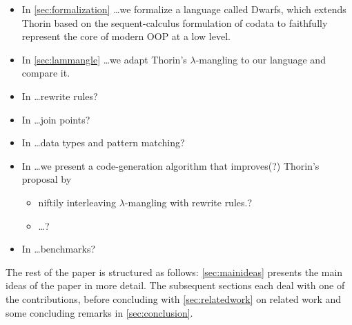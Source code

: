 \begin{itemize}
  \item
    In \cref{sec:formalization} \ldots we formalize a language called Dwarfs, which extends Thorin based on the sequent-calculus formulation of codata to faithfully represent the core of modern OOP at a low level.
\item
    In \cref{sec:lammangle} \ldots we adapt Thorin's $\lambda$-mangling to our language and compare it.
  \item
    In \ldots rewrite rules?
  \item
    In \ldots join points?
  \item
    In \ldots data types and pattern matching?
  \item
    In \ldots we present a code-generation algorithm that improves(?) Thorin's proposal by
    \begin{itemize}
      \item
        niftily interleaving $\lambda$-mangling with rewrite rules.?
      \item
        \ldots?
    \end{itemize}
  \item
    In \ldots benchmarks?
\end{itemize}
The rest of the paper is structured as follows: \cref{sec:mainideas} presents the main ideas of the paper in more detail.
The subsequent sections each deal with one of the contributions, before concluding with \cref{sec:relatedwork} on related work and some concluding remarks in \cref{sec:conclusion}.
